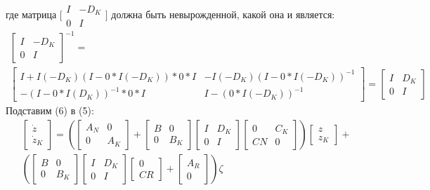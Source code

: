 где матрица $\bigl[ \begin{smallmatrix}  {I} & -{D}_K \\ 0 & {I} \end{smallmatrix} \bigr]$ должна быть невырожденной, какой она и является:
\begin{equation}
\begin{gathered}
	\begin{bmatrix}
		{I} & -{D}_K \\ 0 & {I}
	\end{bmatrix}^{-1} = 
	\\
	\begin{bmatrix}
		{I} + {I}(-{D}_K)({I}-0*{I}(-{D}_K))*0*{I} & -{I}(-{D}_K)({I}-0*{I}(-{D}_K))^{-1}\\
		-({I} - 0*{I}({D}_K))^{-1}*0*{I} &
		{I}-(0*{I}(-{D}_K))^{-1}
	\end{bmatrix}= 
	\begin{bmatrix}
		{I} & {D}_K \\ 0 & {I}
	\end{bmatrix}
\end{gathered}
\end{equation}
Подставим (6) в (5):
\begin{align}
	& \begin{bmatrix}
		{\dot{z}} \\ {\dot{z}}_K 
	\end{bmatrix}
	=\left(
	\begin{bmatrix}
		{A}_N & 0 \\
		0 & {A}_K
	\end{bmatrix}
	+
	\begin{bmatrix}
		{B} & 0 \\
		0 & {B}_K
	\end{bmatrix}
	\begin{bmatrix}
		{I} & {D}_K \\
		0 & {I}
	\end{bmatrix}
	\begin{bmatrix}
		0 & {C}_K \\
		{C}{N} & 0
	\end{bmatrix}
	\right)
	\begin{bmatrix}
		{z} \\ {z}_K
	\end{bmatrix}
	+ \\
	& \left(
	\begin{bmatrix}
		{B} & 0 \\
		0 & {B}_K
	\end{bmatrix}
	\begin{bmatrix}
		{I} & {D}_K \\
		0 & {I}
	\end{bmatrix}
	\begin{bmatrix}
		0 \\ {C}{R}
	\end{bmatrix}
	+
	\begin{bmatrix}
		{A}_R \\ 0 
	\end{bmatrix}\right)
	{\zeta}
\end{align}
